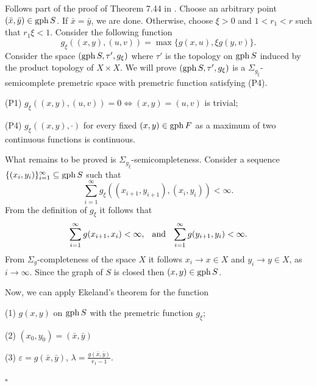 \documentclass{article}
\def\gph{\mathop{\rm gph}}
\def\gph{\mathop{\rm gph}}
\def\text#1{\,\;\hbox{#1}\;\,}
\renewenvironment{proof}
         {\begin{trivlist}\item[
         {\bf Proof.}]}{{\hfill $\square$} \end{trivlist}}
\begin{document}
\begin{proof}
 Follows part of the proof of Theorem 7.44 in \cite{Io}. Choose an arbitrary point $(\bar{x},\bar{y}) \in \gph  S$. If $\bar{x}=\bar{y}$, we are done. Otherwise, choose $\xi>0$ and $1<r_1<r$ such that $r_1\xi<1$. Consider the following function 
 \[g_\xi((x,y),(u,v))=\max\{g(x,u),\xi g(y,v)\}.\]
 Consider the space $(\gph S, \tau', g_\xi)$ where $\tau'$ is the topology on $\gph S$ induced by the product topology of $X \times X$. We will prove $(\gph S, \tau', g_\xi)$ is a $\Sigma_{g_{\xi}}$-semicomplete premetric space with premetric function satisfying (P4).

 
 (P1) $g_\xi((x,y),(u,v))=0 \Leftrightarrow  (x,y)=(u,v)$ is trivial;

 (P4) $g_{\xi}((x,y), \cdot)$ for every fixed $(x,y) \in \gph F$ as a maximum of two continuous functions is continuous. 

    
    
    
 What remains to be proved is $\Sigma_{g_{\xi}}$-semicompleteness. Consider a sequence $\{(x_i,y_i)\}^{\infty}_{i=1} \subseteq \gph S$ such that 
\[\sum_{i=1}^{\infty}g_{\xi}((x_{i+1},y_{i+1}),(x_i,y_i)) < \infty.\]
From the definition of $g_\xi$ it follows that 
\[\sum_{i=1}^{\infty}g(x_{i+1},x_{i}) < \infty, \text{ and }\sum_{i=1}^{\infty}g(y_{i+1},y_i) < \infty.\]
From $\Sigma_g$-completeness of the space $X$ it follows $x_i \rightarrow x \in X$ and $y_i \rightarrow y \in X$, as $i \rightarrow \infty$. Since the graph of $S$ is closed then $(x,y) \in \gph S$.

\smallskip


Now, we can apply Ekeland's theorem for the function

(1) $g(x,y)$ on $ \gph S$ with the premetric function $g_\xi$;

(2) $(x_0,y_0)=(\bar{x},\bar{y})$

(3) $\varepsilon=g(\bar{x},\bar{y})$, $\lambda=\frac{g(\bar{x},\bar{y})}{r_1-1}$.



\end{proof}
\end{document}
